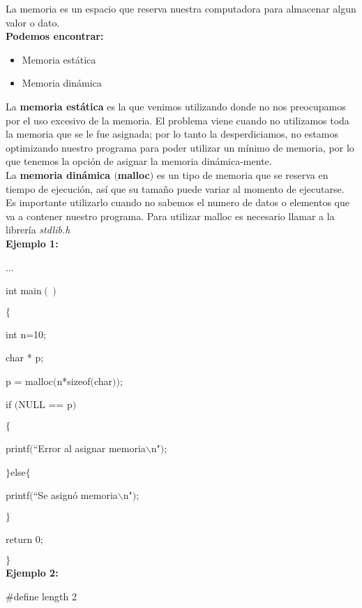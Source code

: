 \documentclass[]{article}
\begin{document}
	La memoria es un espacio que reserva nuestra computadora para almacenar algun valor o dato.\\
	
	\textbf{Podemos encontrar:}
	
	\begin{itemize}
		\item Memoria estática
		\item Memoria dinámica
	\end{itemize}
	
	La \textbf{memoria estática} es la que venimos utilizando donde no nos preocupamos por el uso excesivo de la memoria. El problema viene cuando no utilizamos toda la memoria que se le fue asignada; por lo tanto la desperdiciamos, no estamos optimizando nuestro programa para poder utilizar un mínimo de memoria, por lo que tenemos la opción de asignar la memoria dinámica-mente.\\
	
	La \textbf{memoria dinámica $($malloc$)$} es un tipo de memoria que se reserva en tiempo de ejecución, así que su tamaño puede variar al momento de ejecutarse. Es importante utilizarlo cuando no sabemos el numero de datos o elementos que va a contener nuestro programa. Para utilizar malloc es necesario llamar a la librería \textit{stdlib.h}\\
	
	\textbf{Ejemplo 1:\\}
	
	...
	
	int main$()$
	
	$\lbrace$
	
	int n=10;
	
	char * p;
	
	p = malloc$($n*sizeof$($char$))$;
	
	if $($NULL == p$)$
	
	$\lbrace$
	
	printf$($``Error al asignar memoria$\backslash$n"$)$;
	
	$\rbrace$else$\lbrace$
	
	printf$($``Se asignó memoria$\backslash$n"$)$;
	
	$\rbrace$
	
	return 0;
	
	$\rbrace$\\
	
	
	\textbf{Ejemplo 2:\\}
	
	\#define length 2
	
\end{document}
